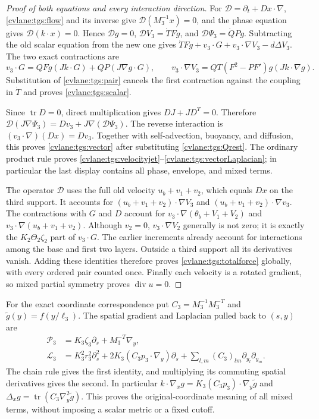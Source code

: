 \begin{proof}[Proof of both equations and every interaction direction]
For $\mathcal D=\partial_t+Dx\cdot\nabla$,
\eqref{cvlane:tgs:flow} and its inverse give
$\mathcal D(M_3^{-1}x)=0$, and the phase equation gives
$\mathcal D(k\cdot x)=0$. Hence $\mathcal Dg=0$,
$\mathcal DV_3=\dot T Fg$, and $\mathcal D\Psi_3=\dot QPg$.
Subtracting the old scalar equation from the new one gives
$\dot T Fg+v_3\cdot G+v_3\cdot\nabla V_3-d\Delta V_3$.
The two exact contractions are
\[
 v_3\cdot G=QFg(Jk\cdot G)+QP(J\nabla g\cdot G),\qquad
 v_3\cdot\nabla V_3=QT(F^2-PF')g(Jk\cdot\nabla g).
\]
Substitution of \eqref{cvlane:tgs:pair} cancels the first contraction
against the coupling in $\dot T$ and proves \eqref{cvlane:tgs:scalar}.

Since $\operatorname{tr}D=0$, direct multiplication gives
$DJ+JD^T=0$. Therefore
$\mathcal D(J\nabla\Psi_3)=Dv_3+J\nabla(\mathcal D\Psi_3)$.
The reverse interaction is $(v_3\cdot\nabla)(Dx)=Dv_3$.
Together with self-advection, buoyancy, and diffusion, this proves
\eqref{cvlane:tgs:vector} after substituting \eqref{cvlane:tgs:Qrest}.
The ordinary product rule proves
\eqref{cvlane:tgs:velocityjet}--\eqref{cvlane:tgs:vectorLaplacian}; in particular
the last display contains all phase, envelope, and mixed terms.

The operator $\mathcal D$ uses the full old velocity $u_b+v_1+v_2$,
which equals $Dx$ on the third support. It accounts for
$(u_b+v_1+v_2)\cdot\nabla V_3$ and
$(u_b+v_1+v_2)\cdot\nabla v_3$.
The contractions with $G$ and $D$ account for
$v_3\cdot\nabla(\theta_b+V_1+V_2)$ and
$v_3\cdot\nabla(u_b+v_1+v_2)$.
Although $v_2=0$, $v_3\cdot\nabla V_2$ generally is not zero;
it is exactly the $K_2\Theta_2\zeta_2$ part of $v_3\cdot G$.
The earlier increments already account for interactions among
the base and first two layers. Outside a third support all its
derivatives vanish. Adding these identities therefore proves
\eqref{cvlane:tgs:totalforce} globally, with every ordered pair counted
once. Finally each velocity is a rotated gradient, so mixed
partial symmetry proves $\operatorname{div}u=0$.
\end{proof}

For the exact coordinate correspondence put
$C_3=M_3^{-1}M_3^{-T}$ and $\widetilde g(y)=f(y/\ell_3)$.
The spatial gradient and Laplacian pulled back to $(s,y)$ are
\begin{equation}\label{cvlane:tgs:metric}
 \begin{split}
 \mathcal P_3&=K_3\zeta_3\partial_s+M_3^{-T}\nabla_y,\\
 \mathcal L_3&=K_3^2r_3^2\partial_s^2
       +2K_3(C_3p_3\cdot\nabla_y)\partial_s
       +\sum_{l,m}(C_3)_{lm}\partial_{y_l}\partial_{y_m}.
 \end{split}
\end{equation}
The chain rule gives the first identity, and multiplying its
commuting spatial derivatives gives the second. In particular
$k\cdot\nabla_xg=K_3(C_3p_3)\cdot\nabla_y\widetilde g$ and
$\Delta_xg=\operatorname{tr}(C_3\nabla_y^2\widetilde g)$.
This proves the original-coordinate meaning of all mixed terms,
without imposing a scalar metric or a fixed cutoff.

